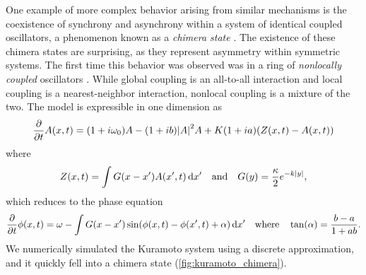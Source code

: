 One example of more complex behavior arising from similar mechanisms is the coexistence of synchrony and asynchrony within a system of identical coupled oscillators, a phenomenon known as a \textit{chimera state} \cite{Kuramoto2002,Abrams2004}.
The existence of these chimera states are surprising, as they represent asymmetry within symmetric systems.
The first time this behavior was observed was in a ring of \textit{nonlocally coupled} oscillators \cite{Kuramoto2002}.
While global coupling is an all-to-all interaction and local coupling is a nearest-neighbor interaction, nonlocal coupling is a mixture of the two.
The model is expressible in one dimension as
\begin{equation}
  \label{eq:kuramoto}
  \pdv{t} A(x, t)
  =
  \pqty{1 + i \omega_{0}} A
  -
  \pqty{1 + i b} \abs{A}^{2} A
  +
  K \pqty{1 + i a} \pqty{Z(x, t) - A(x, t)}
\end{equation}
where
\begin{equation}
  \label{eq:kuramoto_coupling}
  Z(x, t)
  =
  \int{G(x - x') A(x', t) \dd{x'}}
  \qand
  G(y)
  =
  \frac{\kappa}{2} e^{-k \abs{y}},
\end{equation}
which reduces to the phase equation
\begin{equation}
  \label{eq:kuramoto_phase}
  \pdv{t} \phi(x, t)
  =
  \omega
  -
  \int{G(x - x') \sin(\phi(x, t) - \phi(x', t) + \alpha) \dd{x'}}
  \qq{where}
  \tan(\alpha)
  =
  \frac{b - a}{1 + a b}.
\end{equation}
We numerically simulated the Kuramoto system using a discrete approximation, and it quickly fell into a chimera state (\cref{fig:kuramoto_chimera}).
